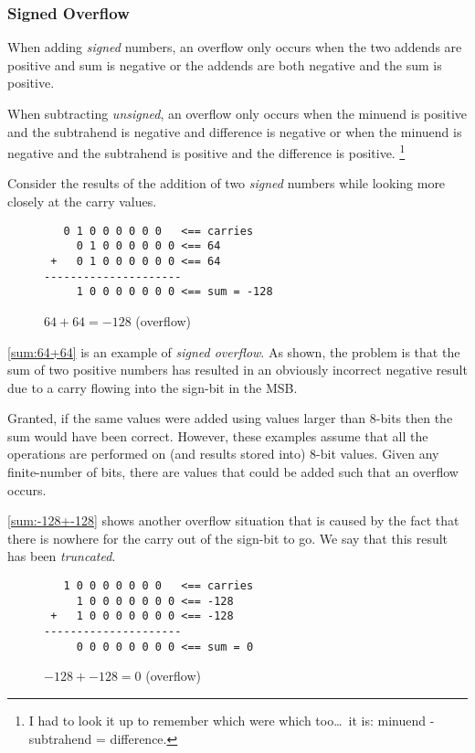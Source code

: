 \subsubsection{Signed Overflow}

When adding {\em signed} numbers, an overflow only occurs when the two 
addends are positive and sum is negative or the addends are both negative 
and the sum is positive.  

When subtracting {\em unsigned}, an overflow only occurs when the
minuend is positive and the subtrahend is negative and difference is negative
or when the minuend is negative and the subtrahend is positive and the 
difference is positive.%
\footnote{I had to look it up to remember which were which 
too\ldots\ it is: minuend - subtrahend = difference.\cite{subtrahend}}

Consider the results of the addition of two {\em signed} numbers
while looking more closely at the carry values.

\begin{figure}[H]
\centering
\begin{BVerbatim}
   0 1 0 0 0 0 0 0   <== carries
     0 1 0 0 0 0 0 0 <== 64
 +   0 1 0 0 0 0 0 0 <== 64
---------------------
     1 0 0 0 0 0 0 0 <== sum = -128
\end{BVerbatim}
\caption{$64+64 = -128$ (overflow)}
\label{sum:64+64}
\end{figure}



\autoref{sum:64+64} is an example of {\em signed overflow}.  As shown, the problem is 
that the sum of two positive numbers has resulted in an obviously incorrect
negative result due to a carry flowing into the sign-bit in the MSB.

Granted, if the same values were added using values larger than 8-bits 
then the sum would have been correct.  However, these examples assume that 
all the operations are performed on (and results stored into) 8-bit values.  
Given any finite-number of bits, there are values that could be added such that
an overflow occurs.

\autoref{sum:-128+-128} shows another overflow situation that is caused 
by the fact that there is nowhere for the carry out of the sign-bit to go.  
We say that this result has been {\em truncated}.

\begin{figure}[H]
\centering
\begin{BVerbatim}
   1 0 0 0 0 0 0 0   <== carries
     1 0 0 0 0 0 0 0 <== -128
 +   1 0 0 0 0 0 0 0 <== -128
---------------------
     0 0 0 0 0 0 0 0 <== sum = 0 
\end{BVerbatim}
\caption{$-128+-128 = 0$ (overflow)}
\label{sum:-128+-128}
\end{figure}


